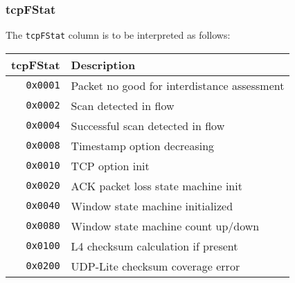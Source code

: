 \documentclass[documentation]{subfiles}
\begin{document}
\subsubsection{tcpFStat}\label{tcpFStat}
The {\tt tcpFStat} column is to be interpreted as follows:
\begin{longtable}{rl}
    \toprule
    {\bf tcpFStat} & {\bf Description}\\
    \midrule\endhead%
    {\tt 0x0001} & Packet no good for interdistance assessment\\
    {\tt 0x0002} & Scan detected in flow\\
    {\tt 0x0004} & Successful scan detected in flow\\
    {\tt 0x0008} & Timestamp option decreasing\\
    {\tt 0x0010} & TCP option init\\
    {\tt 0x0020} & ACK packet loss state machine init\\
    {\tt 0x0040} & Window state machine initialized\\
    {\tt 0x0080} & Window state machine count up/down\\
    {\tt 0x0100} & L4 checksum calculation if present\\
    {\tt 0x0200} & UDP-Lite checksum coverage error\\
    \bottomrule
\end{longtable}
\end{document}
